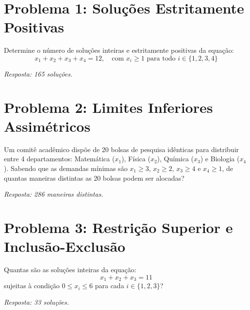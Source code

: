 \documentclass[12pt,a4paper]{report}
\begin{document}
	\section*{Problema 1: Soluções Estritamente Positivas}
	\begin{destaque}
		Determine o número de soluções inteiras e estritamente positivas da equação:
		$$x_1 + x_2 + x_3 + x_4 = 12, \quad \text{com } x_i \ge 1 \text{ para todo } i \in \{1, 2, 3, 4\}$$
	\end{destaque}
	
	\textit{Resposta: 165 soluções.}
	
	\section*{Problema 2: Limites Inferiores Assimétricos}
	\begin{destaque}
		Um comitê acadêmico dispõe de 20 bolsas de pesquisa idênticas para distribuir entre 4 departamentos: Matemática ($x_1$), Física ($x_2$), Química ($x_3$) e Biologia ($x_4$). Sabendo que as demandas mínimas são $x_1 \ge 3$, $x_2 \ge 2$, $x_3 \ge 4$ e $x_4 \ge 1$, de quantas maneiras distintas as 20 bolsas podem ser alocadas?
	\end{destaque}
	
	\textit{Resposta: 286 maneiras distintas.}
	
	\section*{Problema 3: Restrição Superior e Inclusão-Exclusão}
	\begin{destaque}
		Quantas são as soluções inteiras da equação:
		$$x_1 + x_2 + x_3 = 11$$
		sujeitas à condição $0 \le x_i \le 6$ para cada $i \in \{1, 2, 3\}$?
	\end{destaque}
	
	\textit{Resposta: 33 soluções.}
	
\end{document}
